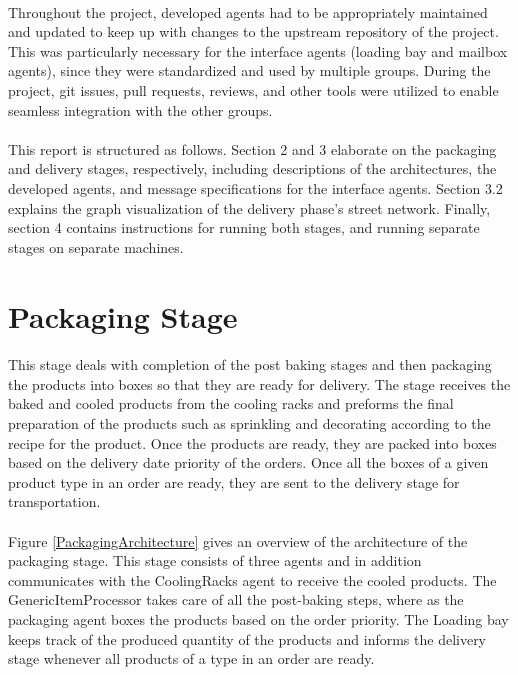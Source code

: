 \documentclass[11pt, a4paper]{article}
\begin{document}
\paragraph{}
Throughout the project, developed agents had to be appropriately maintained and updated to keep up with changes to the upstream repository of the project. This was particularly necessary for the interface agents (loading bay and mailbox agents), since they were standardized and used by multiple groups. During the project, git issues, pull requests, reviews, and other tools were utilized to enable seamless integration with the other groups.

\paragraph{}
This report is structured as follows. Section 2 and 3 elaborate on the packaging and delivery stages, respectively, including descriptions of the architectures, the developed agents, and message specifications for the interface agents. Section 3.2 explains the graph visualization of the delivery phase's street network. Finally, section 4 contains instructions for running both stages, and running separate stages on separate machines.

\section{Packaging Stage}\label{PackagingStage}
\paragraph{}
This stage deals with completion of the post baking stages and then packaging the products into boxes so that they are ready for delivery. The stage receives the baked and cooled products from the cooling racks and preforms the final preparation of the products such as sprinkling and decorating according to the recipe for the product. Once the products are ready, they are packed into boxes based on the delivery date priority of the orders. Once all the boxes of a given product type in an order are ready, they are sent to the delivery stage for transportation.

\paragraph{}
Figure \ref{PackagingArchitecture} gives an overview of the architecture of the packaging stage. This stage consists of three agents and in addition communicates with the CoolingRacks agent to receive the cooled products. The GenericItemProcessor takes care of all the post-baking steps, where as the packaging agent boxes the products based on the order priority. The Loading bay keeps track of the produced quantity of the products and informs the delivery stage whenever all products of a type in an order are ready.
\end{document}
